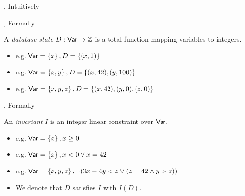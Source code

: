 \documentclass[xcolor={dvipsnames,svgnames,table}]{beamer}
\newcommand{\set}[1]{\left\{#1\right\}}
\begin{document}
\begin{frame}{\iconfluence{}, Intuitively}
  \begin{center}
  \end{center}
\end{frame}

\begin{frame}{\iconfluence{}, Formally}
  \begin{center}
    \huge
    A \emph{database state} $D: \textsf{Var} \to \mathbb{Z}$ is a total function mapping
    variables to integers.
  \end{center}
  \begin{itemize}
    \item e.g. $\var = \set{x}, D = \set{(x, 1)}$
    \item e.g. $\var = \set{x, y}, D = \set{(x, 42), (y, 100)}$
    \item e.g. $\var = \set{x, y, z}, D = \set{(x, 42), (y, 0), (z, 0)}$
  \end{itemize}
\end{frame}

\begin{frame}{\iconfluence{}, Formally}
  \begin{center}
    \huge
    An \emph{invariant} $I$ is an integer linear constraint over $\textsf{Var}$.
  \end{center}
  \begin{itemize}
    \item e.g. $\var = \set{x}, x \geq 0$
    \item e.g. $\var = \set{x}, x < 0 \lor x = 42$
    \item e.g. $\var = \set{x, y, z},
                \lnot(3x - 4y < z \lor (z = 42 \land y > z))$
    \item We denote that $D$ satisfies $I$ with $I(D)$.
  \end{itemize}
\end{frame}
\end{document}
